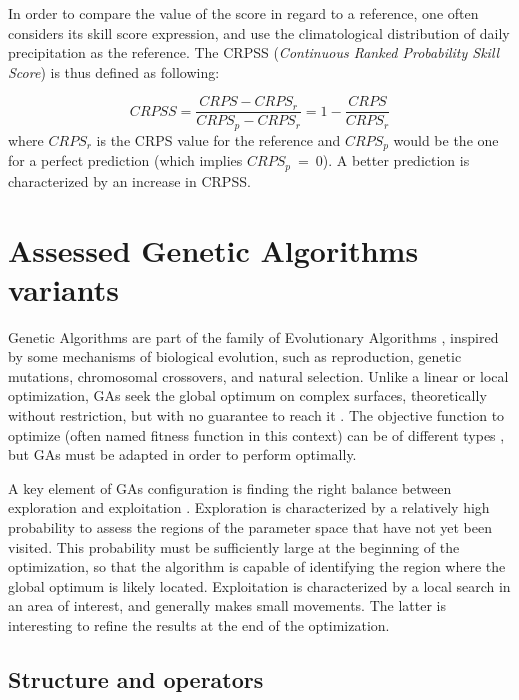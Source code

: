 \documentclass{ametsoc}
\begin{document}
In order to compare the value of the score in regard to a reference, one often considers its skill score expression, and use the climatological distribution of daily precipitation as the reference. The CRPSS (\textit{Continuous Ranked Probability Skill Score}) is thus defined as following:

\begin{equation}
\label{eq:CRPSS}
CRPSS = \frac{CRPS-CRPS_{r}}{CRPS_{p}-CRPS_{r}} = 1-\frac{CRPS}{CRPS_{r}}
\end{equation}
where $CRPS_{r}$ is the CRPS value for the reference and $CRPS_{p}$ would be the one for a perfect prediction (which implies $CRPS_{p}~=~0$). A better prediction is characterized by an increase in CRPSS.


\section{Assessed Genetic Algorithms variants}
\label{sec:gas}

Genetic Algorithms \citep[GAs,][]{Holland1992b, Goldberg1989} are part of the family of Evolutionary Algorithms \citep{Back1993b, Schwefel1993}, inspired by some mechanisms of biological evolution, such as reproduction, genetic mutations, chromosomal crossovers, and natural selection. Unlike a linear or local optimization, GAs seek the global optimum on complex surfaces, theoretically without restriction, but with no guarantee to reach it \citep{Haupt2004}. The objective function to optimize (often named fitness function in this context) can be of different types \citep{Joines1996a}, but GAs must be adapted in order to perform optimally.

A key element of GAs configuration is finding the right balance between exploration and exploitation \citep{Back1992a, Smith1997a}. Exploration is characterized by a relatively high probability to assess the regions of the parameter space that have not yet been visited. This probability must be sufficiently large at the beginning of the optimization, so that the algorithm is capable of identifying the region where the global optimum is likely located. Exploitation is characterized by a local search in an area of interest, and generally makes small movements. The latter is interesting to refine the results at the end of the optimization.


\subsection{Structure and operators}
\label{sec:gas:operators}
\end{document}

